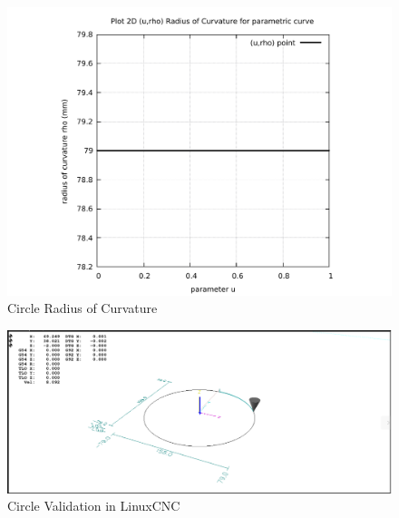 \begin{figure}
	\caption     {Circle Radius of Curvature}
	\label{02-img-Circle Radius of Curvature.pdf}
	\includegraphics[width=1.00\textwidth]{Chap4/appendix/app-Circle/plots/02-img-Circle Radius of Curvature.pdf} 
\end{figure}	


\clearpage
\pagebreak

\begin{figure}
	\caption     {Circle Validation in LinuxCNC}
	\label{03-img-Circle-Validation-in-LinuxCNC.png}
	\includegraphics[width=1.00\textwidth]{Chap4/appendix/app-Circle/plots/03-img-Circle-Validation-in-LinuxCNC.png}
\end{figure}


